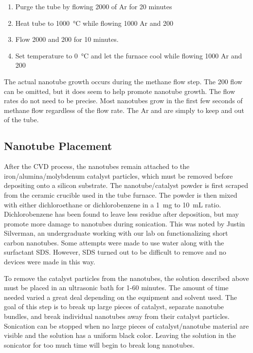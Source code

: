 \begin{enumerate}
	\item Purge the tube by flowing \SI{2000}{\sccm} of Ar for 20 minutes
	\item Heat tube to \SI{1000}{\degreeCelsius} while flowing \SI{1000}{\sccm} Ar and \SI{200}{\sccm} 
	\item Flow \SI{2000}{\sccm}  and \SI{200}{\sccm}  for 10 minutes.
	\item Set temperature to \SI{0}{\degreeCelsius} and let the furnace cool while flowing \SI{1000}{\sccm} Ar and \SI{200}{\sccm} 
\end{enumerate}

\noindent The actual nanotube growth occurs during the methane flow step. The \SI{200}{\sccm}  flow can be omitted, but it does seem to help promote nanotube growth. The flow rates do not need to be precise. Most nanotubes grow in the first few seconds of methane flow regardless of the flow rate. The Ar and  are simply to keep  and  out of the tube. 

\subsection{Nanotube Placement}

After the CVD process, the nanotubes remain attached to the iron\slash alumina\slash molybdenum catalyst particles, which must be removed before depositing onto a silicon substrate. The nanotube\slash catalyst powder is first scraped from the ceramic crucible used in the tube furnace. The powder is then mixed with either dichloroethane or dichlorobenzene in a \SI{1}{\milli\gram} to \SI{10}{\milli\liter} ratio. Dichlorobenzene has been found to leave less residue after deposition, but may promote more damage to nanotubes during sonication. This was noted by Justin Silverman, an undergraduate working with our lab on functionalizing short carbon nanotubes. Some attempts were made to use water along with the surfactant SDS. However, SDS turned out to be difficult to remove and no devices were made in this way.

To remove the catalyst particles from the nanotubes, the solution described above must be placed in an ultrasonic bath for 1-60 minutes. The amount of time needed varied a great deal depending on the equipment and solvent used. The goal of this step is to break up large pieces of catalyst, separate nanotube bundles, and break individual nanotubes away from their catalyst particles. Sonication can be stopped when no large pieces of catalyst\slash nanotube material are visible and the solution has a uniform black color. Leaving the solution in the sonicator for too much time will begin to break long nanotubes. 

